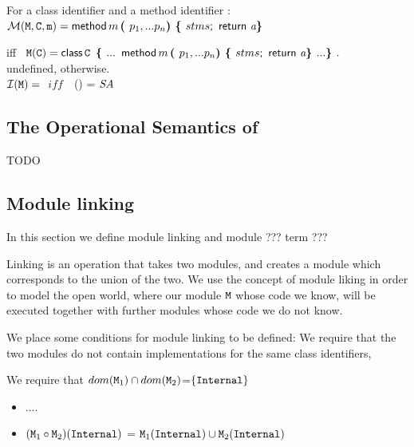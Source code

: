 \documentclass[acmsmall,screen]{acmart}
\begin{document}
  
 \begin{definition}[Lookup]For a class identifier   and a method identifier  : $ ~ $ \\

\noindent
$
{\mathcal M}({{\mbox{\tt{M}}}{{{\mbox{\tt{}}}}}},{\mbox{\tt{{\mbox{\tt{C}}}}}}, {\mbox{\tt{m}}})      =       {\bf{\sf {method}}}\, m\, \mbox{\tt{\bf{( }}} p_1, ... p_n \mbox{\tt{\bf{) }}}
\mbox{\tt{\bf{\{ }}} stms \mbox{{{\bf{\sf {;}}}}\ }\, {\bf{\sf {return}}}\ {{\mbox{\tt{{\it a}}}}} \mbox{\tt{\bf{\} }}}
 $

\noindent
 iff \ $ {\mbox{\tt{M}}}({\mbox{\tt{C}}}) =   {\bf{\sf {class}}}\, {\mbox{\tt{C}}}\, \  \mbox{\tt{\bf{\{ }}} ...  $
 ${\bf{\sf {method}}}\, m\, \mbox{\tt{\bf{( }}} p_1, ... p_n \mbox{\tt{\bf{) }}} \mbox{\tt{\bf{\{ }}} stms \mbox{{{\bf{\sf {;}}}}\ }\, {\bf{\sf {return}}}\ {{\mbox{\tt{{\it a}}}}} \mbox{\tt{\bf{\} }}}  ... \mbox{\tt{\bf{\} }}}.$
\\
\noindent
undefined, otherwise. $ ~ $ \\

$
{\mathcal{ I}} ( {{\mbox{\tt{M}}}} )     =      $$\ \ \ 
 iff\ \  \ $ \M() =  ${\mbox{\tt{{\it SA}}}}$
\\

 
  \end{definition}

\subsection{The Operational Semantics of \LangOO}
\label{formal:semantics}

TODO

\subsection{Module linking}

 In this section we define  module linking and module ??? term ???
 
 Linking is an operation that takes two modules, and creates a module which corresponds  to the union of the two. We use the concept of module liking in order to model the open world, where our module ${\mbox{\tt{M}}}$ whose code we know, will be executed together with further modules whose code we do not know. 

We place some conditions for module linking to be defined: We require that the two modules do not contain implementations for the same class identifiers,  

We require that $dom({\mbox{\tt{M}}}_1) \cap dom({\mbox{\tt{M}}}_2)$=$\{ {\mbox{\tt{Internal}}} \}$

\begin{itemize}
     \item 
   ....
    \item  
   $({\mbox{\tt{M}}}_1 \circ {\mbox{\tt{M}}}_2)({\mbox{\tt{Internal}}})$ = $ {\mbox{\tt{M}}}_1({\mbox{\tt{Internal}}}) \cup  {\mbox{\tt{M}}}_2({\mbox{\tt{Internal}}})$
 \end{itemize}
 
\end{document}
